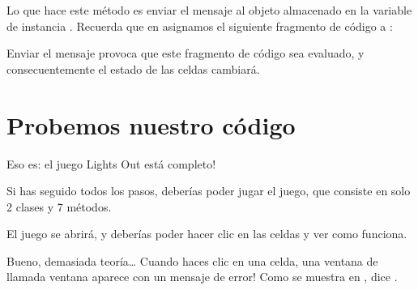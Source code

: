 \documentclass[a4paper,10pt,twoside]{book}
\begin{document}

Lo que hace este m\'etodo es enviar el mensaje  al objeto almacenado en la variable de instancia .
Recuerda que en  asignamos el siguiente fragmento de c\'odigo a :


\noindent
Enviar el mensaje  provoca que este fragmento de c\'odigo sea evaluado, y consecuentemente el estado de las celdas cambiar\'a. 

\section{Probemos nuestro c\'odigo}

Eso es: el juego Lights Out est\'a completo!

Si has seguido todos los pasos, deber\'ias poder jugar el juego, que consiste en solo 2 clases y 7 m\'etodos.


El juego se abrir\'a, y deber\'ias poder hacer clic en las celdas y ver como funciona. 

Bueno, demasiada teor\'ia\ldots{}
Cuando haces clic en una celda, una ventana de  llamada ventana  aparece con un mensaje de error!
Como se muestra en , dice .
\end{document}

